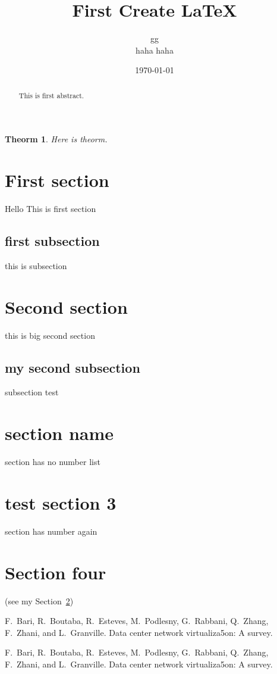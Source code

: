 \documentclass{article}
\begin{document}
  \title{First Create \LaTeX}
  \author{gg\\haha haha}
  \date{\today}
  \maketitle
  \begin{abstract}
    This is first abstract.
  \end{abstract}
  \newtheorem{thm}{Theorm}
  \begin{thm}
    Here is theorm.
  \end{thm}
  
  \section{First section}
  Hello This is first section
    \subsection{first subsection}
    this is subsection
  
  \section{Second section}
\label{sec:algorithm}
  this is big second section
    \subsection{my second subsection}
    subsection test
  
  \section*{section name}
  section has no number list
  
  \section{test section 3}
  section has number again

  \section{Section four}
  (see my Section~\ref{sec:algorithm})

  
  \begin{thebibliography}{9}
  F.~Bari, R.~Boutaba, R.~Esteves, M.~Podlesny, G.~Rabbani, Q.~Zhang, F.~Zhani,
  and L.~Granville.
  \newblock Data center network virtualiza5on: A survey.
  
  F.~Bari, R.~Boutaba, R.~Esteves, M.~Podlesny, G.~Rabbani, Q.~Zhang, F.~Zhani,
  and L.~Granville.
  Data center network virtualiza5on: A survey.
  \end{thebibliography}
\end{document}
